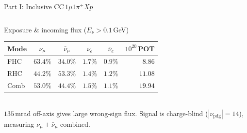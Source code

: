 \documentclass[aspectratio=169,10pt]{beamer}
\begin{document}
\begin{frame}{Part I: Inclusive CC$\,1\mu1\pi^{\pm}Xp$}
\begin{columns}[T]
  \begin{block}{\small Exposure \& incoming flux ($E_\nu>0.1$\,GeV)}\scriptsize
  \centering\setlength{\tabcolsep}{2.5pt}
  \begin{tabular}{lccccr}
  \toprule
  Mode & $\nu_\mu$ & $\bar\nu_\mu$ & $\nu_e$ & $\bar\nu_e$ & $10^{20}$\,POT\\\midrule
  FHC  & $63.4\%$ & $34.0\%$ & $1.7\%$ & $0.9\%$ & $8.86$\\
  RHC  & $44.2\%$ & $53.3\%$ & $1.4\%$ & $1.2\%$ & $11.08$\\
  Comb & $53.0\%$ & $44.4\%$ & $1.5\%$ & $1.1\%$ & $19.94$\\
  \bottomrule
  \end{tabular}\\[1mm]
  {\tiny $135$\,mrad off-axis gives large wrong-sign flux. Signal is charge-blind ($|\nu_\mathrm{pdg}|=14$), measuring $\nu_\mu+\bar\nu_\mu$ combined.}
  \end{block}
  \end{columns}
\end{frame}
\end{document}
